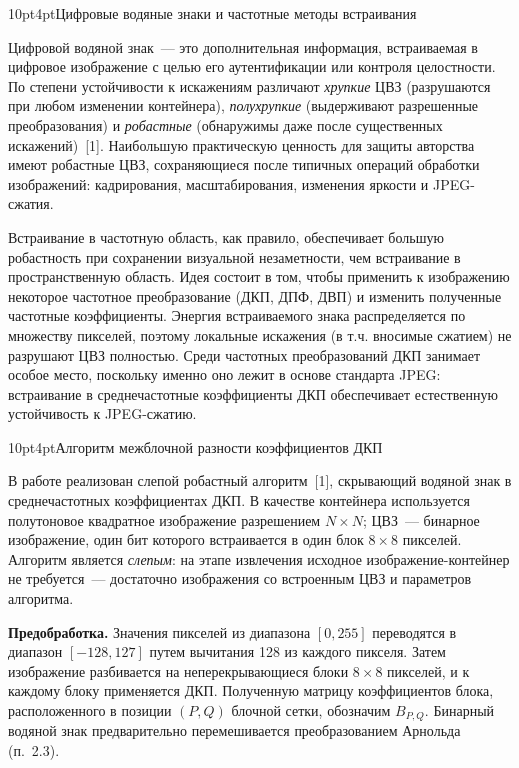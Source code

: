 \documentclass[12pt,a4paper]{article}
\makeatletter
\renewcommand\subsection{\@startsection{subsection}{2}{\z@}%
  {10pt}{4pt}{\normalfont\normalsize\bfseries}}
\makeatother
\begin{document}
\subsection{Цифровые водяные знаки и частотные методы встраивания}

Цифровой водяной знак~--- это дополнительная информация, встраиваемая в цифровое изображение с целью его аутентификации или контроля целостности. По степени устойчивости к искажениям различают \textit{хрупкие} ЦВЗ (разрушаются при любом изменении контейнера), \textit{полухрупкие} (выдерживают разрешенные преобразования) и \textit{робастные} (обнаружимы даже после существенных искажений)~[1]. Наибольшую практическую ценность для защиты авторства имеют робастные ЦВЗ, сохраняющиеся после типичных операций обработки изображений: кадрирования, масштабирования, изменения яркости и JPEG-сжатия.

Встраивание в частотную область, как правило, обеспечивает большую робастность при сохранении визуальной незаметности, чем встраивание в пространственную область. Идея состоит в том, чтобы применить к изображению некоторое частотное преобразование (ДКП, ДПФ, ДВП) и изменить полученные частотные коэффициенты. Энергия встраиваемого знака распределяется по множеству пикселей, поэтому локальные искажения (в т.ч. вносимые сжатием) не разрушают ЦВЗ полностью. Среди частотных преобразований ДКП занимает особое место, поскольку именно оно лежит в основе стандарта JPEG: встраивание в среднечастотные коэффициенты ДКП обеспечивает естественную устойчивость к JPEG-сжатию.

\subsection{Алгоритм межблочной разности коэффициентов ДКП}

В работе реализован слепой робастный алгоритм~[1], скрывающий водяной знак в среднечастотных коэффициентах ДКП. В качестве контейнера используется полутоновое квадратное изображение разрешением $N \times N$; ЦВЗ~--- бинарное изображение, один бит которого встраивается в один блок $8 \times 8$ пикселей. Алгоритм является \textit{слепым}: на этапе извлечения исходное изображение-контейнер не требуется~--- достаточно изображения со встроенным ЦВЗ и параметров алгоритма.

\textbf{Предобработка.} Значения пикселей из диапазона $[0, 255]$ переводятся в диапазон $[-128, 127]$ путем вычитания 128 из каждого пикселя. Затем изображение разбивается на неперекрывающиеся блоки $8 \times 8$ пикселей, и к каждому блоку применяется ДКП. Полученную матрицу коэффициентов блока, расположенного в позиции $(P, Q)$ блочной сетки, обозначим $B_{P,Q}$. Бинарный водяной знак предварительно перемешивается преобразованием Арнольда (п.~2.3).
\end{document}
